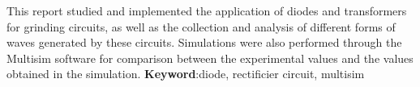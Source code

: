  \setlength{\absparsep}{18pt} %
\begin{resumo}[Abstract]
This report studied and implemented the application of diodes and transformers for grinding circuits, as well as the collection and analysis of different forms of waves generated by these circuits. Simulations were also performed through the Multisim software for comparison between the experimental values and the values obtained in the simulation.
 \noindent
 \textbf{Keyword}:diode, rectificier circuit, multisim
 \end{resumo} 